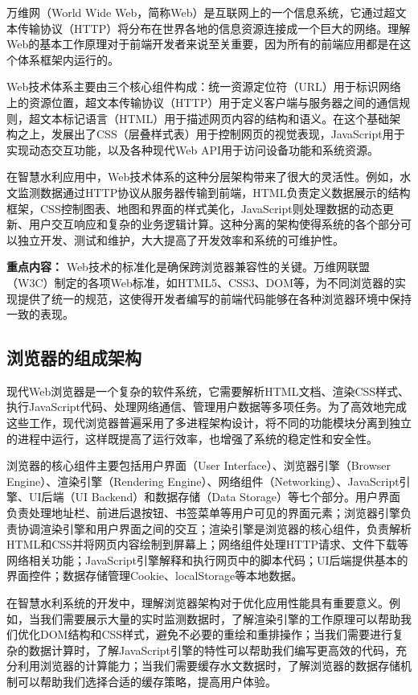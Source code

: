 万维网（World Wide Web，简称Web）是互联网上的一个信息系统，它通过超文本传输协议（HTTP）将分布在世界各地的信息资源连接成一个巨大的网络。理解Web的基本工作原理对于前端开发者来说至关重要，因为所有的前端应用都是在这个体系框架内运行的。

Web技术体系主要由三个核心组件构成：统一资源定位符（URL）用于标识网络上的资源位置，超文本传输协议（HTTP）用于定义客户端与服务器之间的通信规则，超文本标记语言（HTML）用于描述网页内容的结构和语义。在这个基础架构之上，发展出了CSS（层叠样式表）用于控制网页的视觉表现，JavaScript用于实现动态交互功能，以及各种现代Web API用于访问设备功能和系统资源。

在智慧水利应用中，Web技术体系的这种分层架构带来了很大的灵活性。例如，水文监测数据通过HTTP协议从服务器传输到前端，HTML负责定义数据展示的结构框架，CSS控制图表、地图和界面的样式美化，JavaScript则处理数据的动态更新、用户交互响应和复杂的业务逻辑计算。这种分离的架构使得系统的各个部分可以独立开发、测试和维护，大大提高了开发效率和系统的可维护性。

\textbf{重点内容：} Web技术的标准化是确保跨浏览器兼容性的关键。万维网联盟（W3C）制定的各项Web标准，如HTML5、CSS3、DOM等，为不同浏览器的实现提供了统一的规范，这使得开发者编写的前端代码能够在各种浏览器环境中保持一致的表现。

\subsection{浏览器的组成架构}\label{ux6d4fux89c8ux5668ux7684ux7ec4ux6210ux67b6ux6784}

现代Web浏览器是一个复杂的软件系统，它需要解析HTML文档、渲染CSS样式、执行JavaScript代码、处理网络通信、管理用户数据等多项任务。为了高效地完成这些工作，现代浏览器普遍采用了多进程架构设计，将不同的功能模块分离到独立的进程中运行，这样既提高了运行效率，也增强了系统的稳定性和安全性。

浏览器的核心组件主要包括用户界面（User Interface）、浏览器引擎（Browser Engine）、渲染引擎（Rendering Engine）、网络组件（Networking）、JavaScript引擎、UI后端（UI Backend）和数据存储（Data Storage）等七个部分。用户界面负责处理地址栏、前进后退按钮、书签菜单等用户可见的界面元素；浏览器引擎负责协调渲染引擎和用户界面之间的交互；渲染引擎是浏览器的核心组件，负责解析HTML和CSS并将网页内容绘制到屏幕上；网络组件处理HTTP请求、文件下载等网络相关功能；JavaScript引擎解释和执行网页中的脚本代码；UI后端提供基本的界面控件；数据存储管理Cookie、localStorage等本地数据。

在智慧水利系统的开发中，理解浏览器架构对于优化应用性能具有重要意义。例如，当我们需要展示大量的实时监测数据时，了解渲染引擎的工作原理可以帮助我们优化DOM结构和CSS样式，避免不必要的重绘和重排操作；当我们需要进行复杂的数据计算时，了解JavaScript引擎的特性可以帮助我们编写更高效的代码，充分利用浏览器的计算能力；当我们需要缓存水文数据时，了解浏览器的数据存储机制可以帮助我们选择合适的缓存策略，提高用户体验。

